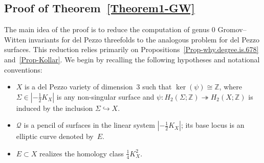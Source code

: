 \documentclass[10pt,a4paper]{article}
\numberwithin{equation}{section}
\theoremstyle{definition}
\theoremstyle{plain}
\theoremstyle{remark}
\newcommand{\Z}{\mathbb{Z}}
\begin{document}
\subsection{Proof of Theorem~\ref{Theorem1-GW}}\label{Sect-Proof.GW}
The main idea of the proof is to reduce the computation of genus $0$ Gromov--Witten invariants for del Pezzo threefolds to the analogous problem for del Pezzo surfaces. This reduction relies primarily on Propositions~\ref{Prop-why.degree.is.678} and~\ref{Prop-Kollar}. We begin by recalling the following hypotheses and notational conventions:
\begin{itemize}
    \item $X$ is a del Pezzo variety of dimension~$3$  such that $\ker(\psi) \cong \Z$, where $\Sigma\in |-\frac{1}{2}K_X|$ is any non-singular surface and $\psi\colon H_2(\Sigma;\Z)\twoheadrightarrow H_2(X;\Z)$ is induced by the inclusion $\Sigma\hookrightarrow X$.
    \item $\mathcal{Q}$ is a pencil of surfaces  in the linear system $|-\frac{1}{2}K_X|$; its base locus is an elliptic curve denoted by~$E$.
    \item $E\subset X$ realizes the homology class $\frac{1}{4}K^2_X$.
\end{itemize}
\end{document}
